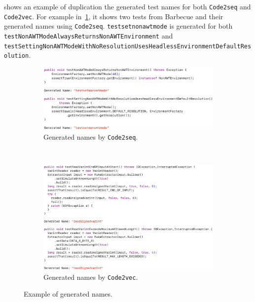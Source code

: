 \begin{appendices}
 shows an example of duplication the generated test names for both \texttt{Code2seq} and \texttt{Code2vec}.
%
For example in~\cref{fig:generated1}, it shows two tests from Barbecue and their generated names using \texttt{Code2seq}.
%
\texttt{test\-set\-non\-awt\-mode} is generated for both \texttt{test\-Non\-AWT\-Mode\-Always\-Returns\-Non\-AWT\-Environment} and \texttt{test\-Setting\-Non\-AWT\-Mode\-With\-No\-Resolution\-Uses\-Headless\-Environment\-Default\-Resolution}.


\begin{figure}[H]
\centering
\begin{subfigure}[b]{1.0\textwidth}
\centering
\includegraphics[scale=0.4]{figures/dup1.png}
\caption{Generated names by \texttt{Code2seq}.}
\label{fig:generated1}
\end{subfigure}\\
\vspace{0.2cm}
\begin{subfigure}[b]{1.0\textwidth}
\centering
\includegraphics[scale=0.4]{figures/dup2.png}
\caption{Generated names by \texttt{Code2vec}.}
\label{fig:generated2}
\end{subfigure}
\caption{Example of generated names.}
\label{fig:duplicate-names}
\end{figure}



\end{appendices}
